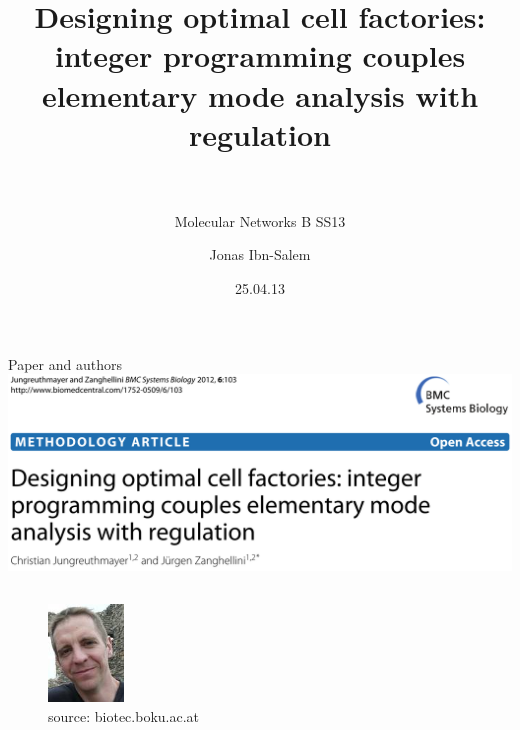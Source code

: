 \documentclass{beamer}
\title[Elementary flux mode analysis]{Designing optimal cell factories: integer programming couples elementary mode analysis with regulation\\~\\}
\subtitle{Molecular Networks B SS13}
\author[Jonas Ibn-Salem]{Jonas Ibn-Salem}
\institute[]{}
\date{25.04.13}
\begin{document}
\maketitle

\begin{frame}{Paper and authors}
    \includegraphics[width=1\textwidth]{grafik/paper}
    \begin{columns}
      \begin{center}
        \begin{figure}
         \includegraphics[width=0.5\textwidth]{grafik/jungreuthmayer} \\
         \tiny{source: biotec.boku.ac.at}
        \end{figure}
      \end{center}

\end{columns}
\end{frame}
\end{document}
